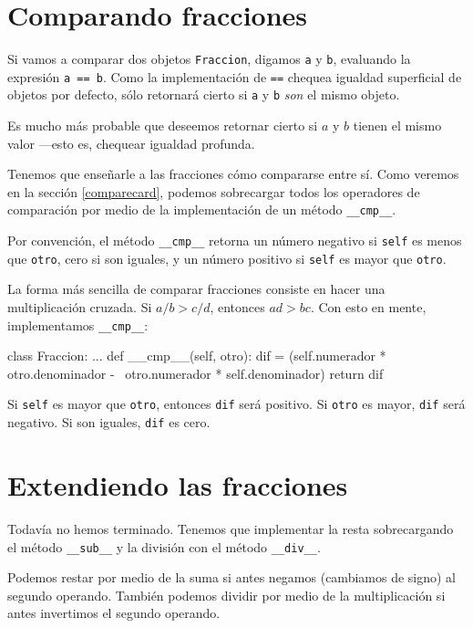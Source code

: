 \section{Comparando fracciones}

 

Si vamos a comparar dos objetos \texttt{Fraccion}, digamos \texttt{a}
y \texttt{b}, evaluando la expresión \texttt{a == b}. Como la implementación
de \texttt{==} chequea igualdad superficial de objetos por defecto,
sólo retornará cierto si \texttt{a} y \texttt{b} \textit{son} el mismo
objeto.

Es mucho más probable que deseemos retornar cierto si $a$ y $b$
tienen el mismo valor —esto es, chequear igualdad profunda.

Tenemos que enseñarle a las fracciones cómo compararse entre sí. Como
veremos en la sección \ref{comparecard}, podemos sobrecargar todos
los operadores de comparación por medio de la implementación de un
método \texttt{\_\_cmp\_\_}.

Por convención, el método \texttt{\_\_cmp\_\_} retorna un número negativo
si \texttt{self} es menos que \texttt{otro}, cero si son iguales,
y un número positivo si \texttt{self} es mayor que \texttt{otro}.

La forma más sencilla de comparar fracciones consiste en hacer una
multiplicación cruzada. Si $a/b>c/d$, entonces $ad>bc$. Con esto
en mente, implementamos \texttt{\_\_cmp\_\_}:

\begin{pythoncode}
class Fraccion:
  ...
  def __cmp__(self, otro):
    dif = (self.numerador  * otro.denominador - \
            otro.numerador * self.denominador)
    return dif
\end{pythoncode}
 Si \texttt{self} es mayor que \texttt{otro}, entonces \texttt{dif}
será positivo. Si \texttt{otro} es mayor, \texttt{dif} será negativo.
Si son iguales, \texttt{dif} es cero.

\section{Extendiendo las fracciones}

Todavía no hemos terminado. Tenemos que implementar la resta sobrecargando
el método \texttt{\_\_sub\_\_} y la división con el método \texttt{\_\_div\_\_}.

Podemos restar por medio de la suma si antes negamos (cambiamos de
signo) al segundo operando. También podemos dividir por medio de la
multiplicación si antes invertimos el segundo operando.

